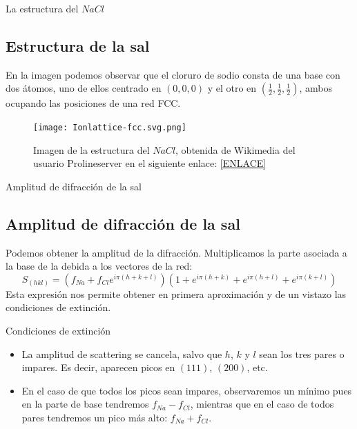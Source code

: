 \documentclass{beamer}
\begin{document}
\begin{frame}{La estructura del $NaCl$}
    \subsection{Estructura de la sal}
    En la imagen podemos observar que el cloruro de sodio consta de una base con dos átomos, uno de ellos centrado en $(0, 0, 0)$ y el otro en $\left(\frac{1}{2}, \frac{1}{2}, \frac{1}{2}\right)$, ambos ocupando las posiciones de una red FCC.
    \begin{figure}[h!]
        \begin{center}
            \texttt{[image: Ionlattice-fcc.svg.png]}
        \end{center}
        \caption{Imagen de la estructura del $NaCl$, obtenida de Wikimedia del usuario Prolineserver en el siguiente enlace: \href{https://commons.wikimedia.org/wiki/File:Ionlattice-fcc.svg}{[ENLACE]}}
    \end{figure}
\end{frame}
\begin{frame}{Amplitud de difracción de la sal}
    \subsection{Amplitud de difracción de la sal}
    Podemos obtener la amplitud de la difracción. Multiplicamos la parte asociada a la base de la debida a los vectores de la red:
    \begin{equation}
        S_{(hkl)} = \left(f_{Na} + f_{Cl}e^{i\pi(h+k+l)}\right)\left(1 + e^{i\pi(h+k)} + e^{i\pi(h+l)} + e^{i\pi(k+l)}\right)
    \end{equation}
    Esta expresión nos permite obtener en primera aproximación y de un vistazo las condiciones de extinción.
    \begin{block}{Condiciones de extinción}
        \begin{itemize}
            \item La amplitud de scattering se cancela, salvo que $h$, $k$ y $l$ sean los tres pares o impares. Es decir, aparecen picos en $(111)$, $(200)$, etc.
            \item En el caso de que todos los picos sean impares, observaremos un mínimo pues en la parte de base tendremos $f_{Na} - f_{Cl}$, mientras que en el caso de todos pares tendremos un pico más alto: $f_{Na} + f_{Cl}$.
        \end{itemize}
    \end{block}
\end{frame}
\end{document}
